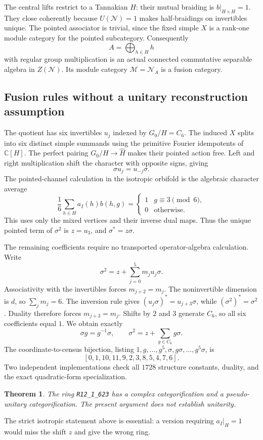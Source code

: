 \documentclass[11pt]{article}
\newtheorem{theorem}{Theorem}
\newcommand{\R}[1]{\texttt{R12\_1\_#1}}
\newcommand{\C}{\mathbb C}
\begin{document}
The central lifts restrict to a Tannakian $H$: their mutual braiding
is $b|_{H\times H}=1$. They close coherently because $U(\mathcal N)=1$
makes half-braidings on invertibles unique. The pointed associator is
trivial, since the fixed simple $X$ is a rank-one module category for
the pointed subcategory. Consequently
\[
 A=\bigoplus_{h\in H}h
\]
with regular group multiplication is an actual connected commutative
separable algebra in $Z(\mathcal N)$. Its module category
$\mathcal M=\mathcal N_A$ is a fusion category.

\subsection{Fusion rules without a unitary reconstruction assumption}
The quotient has six invertibles $u_j$ indexed by $G_0/H=C_6$.
The induced $X$ splits into six distinct simple summands using the
primitive Fourier idempotents of $\C[H]$. The perfect pairing
$G_0/H\to\widehat H$ makes their pointed action free. Left and right
multiplication shift the character with opposite signs, giving
\[
 \sigma u_j=u_{-j}\sigma.
\]
The pointed-channel calculation in the isotropic orbifold
\cite[Theorem 12.5]{Izumi} is the algebraic character average
\[
 \frac16\sum_{h\in H}a_I(h)b(h,g)
 =\begin{cases}1&g\equiv3\pmod6,\\0&\text{otherwise.}\end{cases}
\]
This uses only the mixed vertices and their inverse dual maps.
Thus the unique pointed term of $\sigma^2$ is $z=u_3$, and
$\sigma^*=z\sigma$.

The remaining coefficients require no transported operator-algebra
calculation. Write
\[
 \sigma^2=z+\sum_{j=0}^5m_j u_j\sigma.
\]
Associativity with the invertibles forces $m_{j+2}=m_j$.
The noninvertible dimension is $d$, so $\sum_jm_j=6$.
The inversion rule gives $(u_j\sigma)^*=u_{j+3}\sigma$,
while $(\sigma^2)^*=\sigma^2$. Duality therefore forces
$m_{j+3}=m_j$. Shifts by $2$ and $3$ generate $C_6$, so all six
coefficients equal $1$. We obtain exactly
\[
 \sigma g=g^{-1}\sigma,
 \qquad\sigma^2=z+\sum_{g\in C_6}g\sigma.
\]
The coordinate-to-census bijection, listing
$1,g,\ldots,g^5,\sigma,g\sigma,\ldots,g^5\sigma$, is
\[
 [0,1,10,11,9,2,3,8,5,4,7,6].
\]
Two independent implementations check all $1728$ structure constants,
duality, and the exact quadratic-form specialization.

\begin{theorem}
The ring \R{623} has a complex categorification and a pseudo-unitary
categorification. The present argument does not establish unitarity.
\end{theorem}
The strict isotropic statement above is essential: a version requiring
$a_I|_H=1$ would miss the shift $z$ and give the wrong ring.
\end{document}
